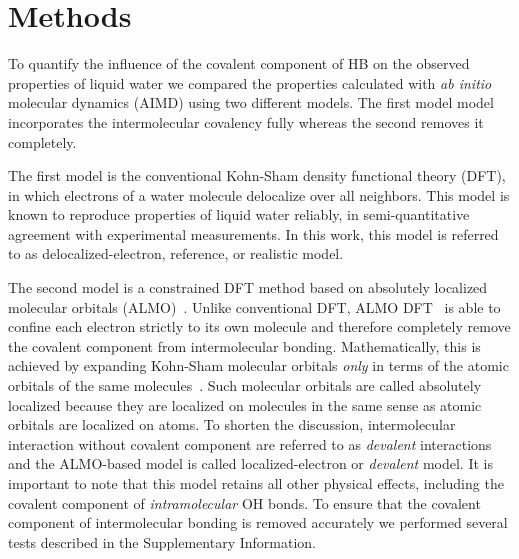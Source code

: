\documentclass[aps,prl,reprint,amsmath,amssymb]{revtex4-1}
\begin{document}

\section{Methods}

To quantify the influence of the covalent component of HB on the observed properties of liquid water we compared the properties calculated with \emph{ab initio} molecular dynamics (AIMD) using two different models. The first model model incorporates the intermolecular covalency fully whereas the second removes it completely.

The first model is the conventional Kohn-Sham density functional theory (DFT), in which electrons of a water molecule delocalize over all neighbors. This model is known to reproduce properties of liquid water reliably, in semi-quantitative agreement with experimental measurements. 
In this work, this model is referred to as delocalized-electron, reference, or realistic model. %

The second model is a constrained DFT method based on absolutely localized molecular orbitals (ALMO)~\cite{khaliullin2006efficient}. Unlike conventional DFT, ALMO DFT~\cite{Khaliullin2013JCTC} is able to confine each electron strictly to its own molecule and therefore completely remove the covalent component from intermolecular bonding. Mathematically, this is achieved by expanding Kohn-Sham molecular orbitals \emph{only} in terms of the atomic orbitals of the same molecules~\cite{gian,khaliullin2006efficient, blw}. Such molecular orbitals are called absolutely localized because they are localized on molecules in the same sense as atomic orbitals are localized on atoms. To shorten the discussion, intermolecular interaction without covalent component are referred to as \emph{devalent} interactions and the ALMO-based model is called localized-electron or \emph{devalent} model. It is important to note that this model retains all other physical effects, including the covalent component of \emph{intramolecular} OH bonds. %
To ensure that the covalent component of intermolecular bonding is removed accurately we performed several tests described in the Supplementary Information.
\end{document}
